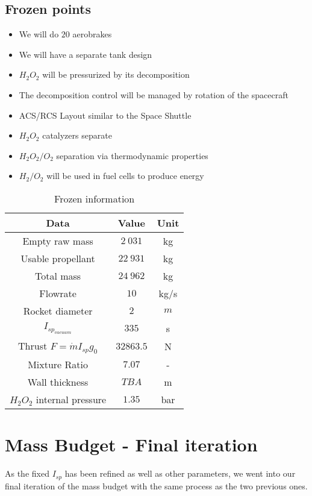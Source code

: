 \subsection{Frozen points}
\begin{itemize}
\item We will do $20$ aerobrakes
\item We will have a separate tank design
\item $H_2O_2$ will be pressurized by its decomposition
\item The decomposition control will be managed by rotation of the spacecraft
\item ACS/RCS Layout similar to the Space Shuttle
\item $H_2O_2$ catalyzers separate
\item $H_2O_2/O_2$ separation via thermodynamic properties
\item $H_2/O_2$ will be used in fuel cells to produce energy
\end{itemize}
\begin{table}
\centering
\begin{tabular}[H]{|c|c|c|}
	\hline
	\cellcolor{gray!50}Data & \cellcolor{gray!50}Value & \cellcolor{gray!50}Unit\\
	\hline
	Empty raw mass & $2\ 031$ & kg\\
	\hline
	Usable propellant & $22\ 931$ &kg\\
	\hline
	\cellcolor{green!50}Total mass & \cellcolor{green!50}$24\ 962$ & \cellcolor{green!50}kg\\
	\hline
	Flowrate & $10$ & kg/s\\
	\hline
	Rocket diameter & $2$ & $m$\\
	\hline
	$I_{sp_{vacuum}}$ & $335$ & s\\
	\hline
	Thrust $F=\dot m I_{sp} g_0$ & $32 863.5$ &N\\
	\hline
	Mixture Ratio & $7.07$ & -\\
	\hline
	Wall thickness & $TBA$ & m\\
	\hline
	$H_2O_2$ internal pressure & $1.35$ & bar\\
	\hline
\end{tabular}
\caption{Frozen information}
\end{table}

\newpage
\section{Mass Budget - Final iteration}
As the fixed $I_{sp}$ has been refined as well as other parameters, we went into our final iteration of the mass budget with the same process as the two previous ones.
